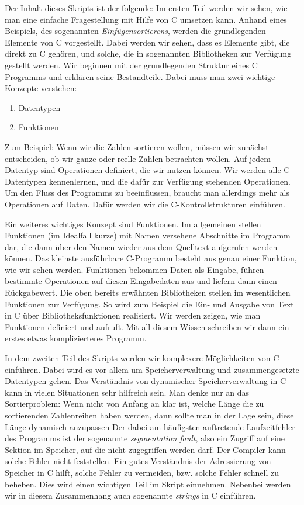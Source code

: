 Der Inhalt dieses Skripts ist der folgende: Im ersten Teil werden wir sehen, wie man eine einfache Fragestellung mit Hilfe von C umsetzen kann.
Anhand eines Beispiels, des sogenannten \emph{Einfügensortierens}, werden die grundlegenden Elemente von C vorgestellt.
Dabei werden wir sehen, dass es Elemente gibt, die direkt zu C gehören, und solche, die in sogenannten Bibliotheken zur Verfügung gestellt werden.
Wir beginnen mit der grundlegenden Struktur eines C Programms und erklären seine Bestandteile.
Dabei muss man zwei wichtige Konzepte verstehen:
\begin{enumerate}
\item Datentypen
\item Funktionen
\end{enumerate}
Zum Beispiel: Wenn wir die Zahlen sortieren wollen, müssen wir zunächst entscheiden, ob wir ganze oder reelle Zahlen betrachten wollen.
Auf jedem Datentyp sind Operationen definiert, die wir nutzen können.
Wir werden alle C-Datentypen kennenlernen, und die dafür zur Verfügung stehenden Operationen.
Um den Fluss des Programms zu beeinflussen, braucht man allerdings mehr als Operationen auf Daten.
Dafür werden wir die C-Kontrollstrukturen einführen.

Ein weiteres wichtiges Konzept sind Funktionen.
Im allgemeinen stellen Funktionen (im Idealfall kurze) mit Namen versehene Abschnitte im Programm dar, die dann über den Namen wieder aus dem Quelltext aufgerufen werden können.
Das kleinste ausführbare C-Programm besteht aus genau einer Funktion, wie wir sehen werden.
Funktionen bekommen Daten als Eingabe, führen bestimmte Operationen auf diesen Eingabedaten aus und liefern dann einen Rückgabewert.
Die oben bereits erwähnten Bibliotheken stellen im wesentlichen Funktionen zur Verfügung.
So wird zum Beispiel die Ein- und Ausgabe von Text in C über Bibliotheksfunktionen realisiert.
Wir werden zeigen, wie man Funktionen definiert und aufruft.
Mit all diesem Wissen schreiben wir dann ein erstes etwas komplizierteres Programm.

In dem zweiten Teil des Skripts werden wir komplexere Möglichkeiten von C einführen.
Dabei wird es vor allem um Speicherverwaltung und zusammengesetzte Datentypen gehen.
Das Verständnis von dynamischer Speicherverwaltung in C kann in vielen Situationen sehr hilfreich sein.
Man denke nur an das Sortierproblem: Wenn nicht von Anfang an klar ist, welche Länge die zu sortierenden Zahlenreihen haben werden, dann sollte man in der Lage sein, diese Länge dynamisch anzupassen
Der dabei am häufigsten auftretende Laufzeitfehler des Programms ist der sogenannte \emph{segmentation fault}, also ein Zugriff auf eine Sektion im Speicher, auf die nicht zugegriffen werden darf.
Der Compiler kann solche Fehler nicht feststellen.
Ein gutes Verständnis der Adressierung von Speicher in C hilft, solche Fehler zu vermeiden, bzw. solche Fehler schnell zu beheben.
Dies wird einen wichtigen Teil im Skript einnehmen.
Nebenbei werden wir in diesem Zusammenhang auch sogenannte \emph{strings} in C einführen.

